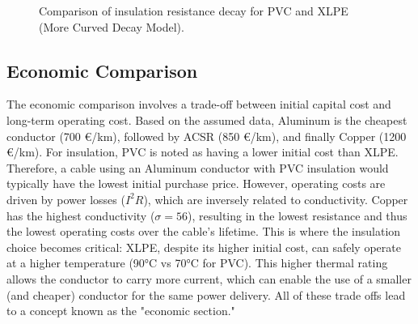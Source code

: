 \documentclass[12pt, a4paper]{article}
\begin{document}
\begin{figure}[h!]
\centering
{}
\caption{Comparison of insulation resistance decay for PVC and XLPE (More Curved Decay Model).}
\end{figure}

\newpage
\subsection{Economic Comparison}
The economic comparison involves a trade-off between initial capital cost and long-term operating cost. Based on the assumed data, Aluminum is the cheapest conductor (700 €/km), followed by ACSR (850 €/km), and finally Copper (1200 €/km). For insulation, PVC is noted as having a lower initial cost than XLPE. Therefore, a cable using an Aluminum conductor with PVC insulation would typically have the lowest initial purchase price. However, operating costs are driven by power losses ($I^2R$), which are inversely related to conductivity. Copper has the highest conductivity ($\sigma=56$), resulting in the lowest resistance and thus the lowest operating costs over the cable's lifetime. This is where the insulation choice becomes critical: XLPE, despite its higher initial cost, can safely operate at a higher temperature (90°C vs 70°C for PVC). This higher thermal rating allows the conductor to carry more current, which can enable the use of a smaller (and cheaper) conductor for the same power delivery. All of these trade offs lead to a concept known as the "economic section."
\end{document}
